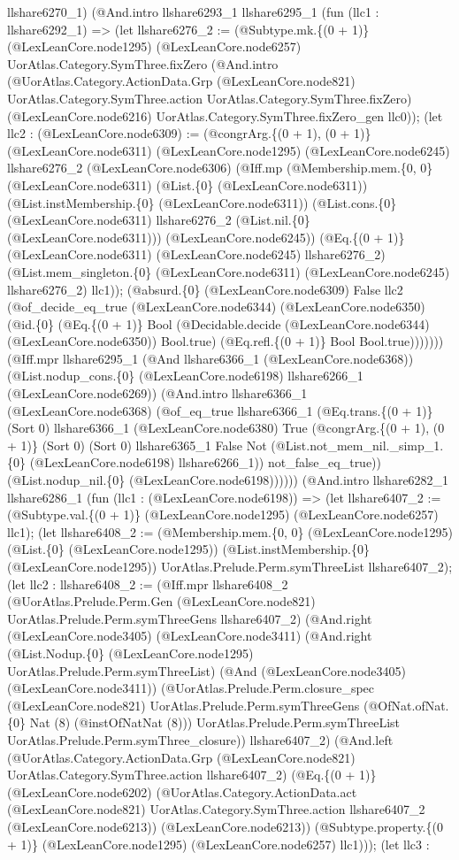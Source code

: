 \documentclass[11pt]{article}
\begin{document}
llshare6270\_1) (@And.intro llshare6293\_1 llshare6295\_1 (fun (llc1 : llshare6292\_1) => (let llshare6276\_2 := (@Subtype.mk.\{(0 + 1)\} (@LexLeanCore.node1295) (@LexLeanCore.node6257) UorAtlas.Category.SymThree.fixZero (@And.intro (@UorAtlas.Category.ActionData.Grp (@LexLeanCore.node821) UorAtlas.Category.SymThree.action UorAtlas.Category.SymThree.fixZero) (@LexLeanCore.node6216) UorAtlas.Category.SymThree.fixZero\_gen llc0)); (let llc2 : (@LexLeanCore.node6309) := (@congrArg.\{(0 + 1), (0 + 1)\} (@LexLeanCore.node6311) (@LexLeanCore.node1295) (@LexLeanCore.node6245) llshare6276\_2 (@LexLeanCore.node6306) (@Iff.mp (@Membership.mem.\{0, 0\} (@LexLeanCore.node6311) (@List.\{0\} (@LexLeanCore.node6311)) (@List.instMembership.\{0\} (@LexLeanCore.node6311)) (@List.cons.\{0\} (@LexLeanCore.node6311) llshare6276\_2 (@List.nil.\{0\} (@LexLeanCore.node6311))) (@LexLeanCore.node6245)) (@Eq.\{(0 + 1)\} (@LexLeanCore.node6311) (@LexLeanCore.node6245) llshare6276\_2) (@List.mem\_singleton.\{0\} (@LexLeanCore.node6311) (@LexLeanCore.node6245) llshare6276\_2) llc1)); (@absurd.\{0\} (@LexLeanCore.node6309) False llc2 (@of\_decide\_eq\_true (@LexLeanCore.node6344) (@LexLeanCore.node6350) (@id.\{0\} (@Eq.\{(0 + 1)\} Bool (@Decidable.decide (@LexLeanCore.node6344) (@LexLeanCore.node6350)) Bool.true) (@Eq.refl.\{(0 + 1)\} Bool Bool.true))))))) (@Iff.mpr llshare6295\_1 (@And llshare6366\_1 (@LexLeanCore.node6368)) (@List.nodup\_cons.\{0\} (@LexLeanCore.node6198) llshare6266\_1 (@LexLeanCore.node6269)) (@And.intro llshare6366\_1 (@LexLeanCore.node6368) (@of\_eq\_true llshare6366\_1 (@Eq.trans.\{(0 + 1)\} (Sort 0) llshare6366\_1 (@LexLeanCore.node6380) True (@congrArg.\{(0 + 1), (0 + 1)\} (Sort 0) (Sort 0) llshare6365\_1 False Not (@List.not\_mem\_nil.\_simp\_1.\{0\} (@LexLeanCore.node6198) llshare6266\_1)) not\_false\_eq\_true)) (@List.nodup\_nil.\{0\} (@LexLeanCore.node6198)))))) (@And.intro llshare6282\_1 llshare6286\_1 (fun (llc1 : (@LexLeanCore.node6198)) => (let llshare6407\_2 := (@Subtype.val.\{(0 + 1)\} (@LexLeanCore.node1295) (@LexLeanCore.node6257) llc1); (let llshare6408\_2 := (@Membership.mem.\{0, 0\} (@LexLeanCore.node1295) (@List.\{0\} (@LexLeanCore.node1295)) (@List.instMembership.\{0\} (@LexLeanCore.node1295)) UorAtlas.Prelude.Perm.symThreeList llshare6407\_2); (let llc2 : llshare6408\_2 := (@Iff.mpr llshare6408\_2 (@UorAtlas.Prelude.Perm.Gen (@LexLeanCore.node821) UorAtlas.Prelude.Perm.symThreeGens llshare6407\_2) (@And.right (@LexLeanCore.node3405) (@LexLeanCore.node3411) (@And.right (@List.Nodup.\{0\} (@LexLeanCore.node1295) UorAtlas.Prelude.Perm.symThreeList) (@And (@LexLeanCore.node3405) (@LexLeanCore.node3411)) (@UorAtlas.Prelude.Perm.closure\_spec (@LexLeanCore.node821) UorAtlas.Prelude.Perm.symThreeGens (@OfNat.ofNat.\{0\} Nat (8) (@instOfNatNat (8))) UorAtlas.Prelude.Perm.symThreeList UorAtlas.Prelude.Perm.symThree\_closure)) llshare6407\_2) (@And.left (@UorAtlas.Category.ActionData.Grp (@LexLeanCore.node821) UorAtlas.Category.SymThree.action llshare6407\_2) (@Eq.\{(0 + 1)\} (@LexLeanCore.node6202) (@UorAtlas.Category.ActionData.act (@LexLeanCore.node821) UorAtlas.Category.SymThree.action llshare6407\_2 (@LexLeanCore.node6213)) (@LexLeanCore.node6213)) (@Subtype.property.\{(0 + 1)\} (@LexLeanCore.node1295) (@LexLeanCore.node6257) llc1))); (let llc3 : 
\end{document}
